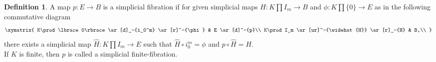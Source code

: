 \documentclass[preprint,11pt %
]{hjm1}
\newtheorem{proposition}[theorem]{Proposition}
\theoremstyle{definition}
\newtheorem{definition}[theorem]{Definition}
\begin{document}
\begin{definition}\label{de2.5}
A map $ p: E \to B $ is a simplicial ﬁbration if for given simplicial maps $H: K \prod  I_m\to B$ and $\phi : K \prod  \lbrace 0\rbrace \to E$ as in the following commutative diagram
\[
\xymatrix{
K\prod  \lbrace 0\rbrace \ar[d]_-{i_0^m} 
\ar[r]^-{\phi} & E \ar[d]^-{p}\\
K\prod  I_m \ar[ur]^-{\widehat{H}} \ar[r]_-{H} & B,\\ 
}
\] 
there exists a simplicial map $ \widehat{H}: K \prod  I_m \to E$ such that $\widehat{H}\circ i_0^m =\phi $ and $p \circ \widehat{H}=H$. \\
If $K$ is finite, then $p$ is called a simplicial finite-fibration.
\end{definition}
\end{document}
